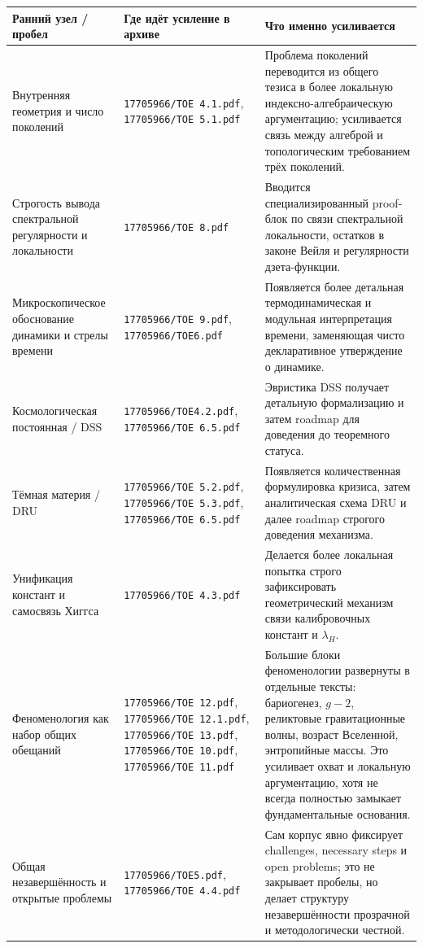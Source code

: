 \documentclass[12pt,a4paper]{article}
\begin{document}
\begin{longtable}{p{4.2cm}p{4.2cm}p{6cm}}
\toprule
Ранний узел / пробел & Где идёт усиление в архиве & Что именно усиливается \\
\midrule
\endhead
Внутренняя геометрия и число поколений & \texttt{17705966/ТОЕ 4.1.pdf}, \texttt{17705966/ТОЕ 5.1.pdf} & Проблема поколений переводится из общего тезиса в более локальную индексно-алгебраическую аргументацию; усиливается связь между алгеброй и топологическим требованием трёх поколений. \\
Строгость вывода спектральной регулярности и локальности & \texttt{17705966/ТОЕ 8.pdf} & Вводится специализированный proof-блок по связи спектральной локальности, остатков в законе Вейля и регулярности дзета-функции. \\
Микроскопическое обоснование динамики и стрелы времени & \texttt{17705966/ТОЕ 9.pdf}, \texttt{17705966/ТОЕ6.pdf} & Появляется более детальная термодинамическая и модульная интерпретация времени, заменяющая чисто декларативное утверждение о динамике. \\
Космологическая постоянная / DSS & \texttt{17705966/TOE4.2.pdf}, \texttt{17705966/ТОЕ 6.5.pdf} & Эвристика DSS получает детальную формализацию и затем roadmap для доведения до теоремного статуса. \\
Тёмная материя / DRU & \texttt{17705966/ТОЕ 5.2.pdf}, \texttt{17705966/ТОЕ 5.3.pdf}, \texttt{17705966/ТОЕ 6.5.pdf} & Появляется количественная формулировка кризиса, затем аналитическая схема DRU и далее roadmap строгого доведения механизма. \\
Унификация констант и самосвязь Хиггса & \texttt{17705966/ТОЕ 4.3.pdf} & Делается более локальная попытка строго зафиксировать геометрический механизм связи калибровочных констант и \(\lambda_H\). \\
Феноменология как набор общих обещаний & \texttt{17705966/ТОЕ 12.pdf}, \texttt{17705966/ТОЕ 12.1.pdf}, \texttt{17705966/ТОЕ 13.pdf}, \texttt{17705966/ТОЕ 10.pdf}, \texttt{17705966/ТОЕ 11.pdf} & Большие блоки феноменологии развернуты в отдельные тексты: бариогенез, \(g-2\), реликтовые гравитационные волны, возраст Вселенной, энтропийные массы. Это усиливает охват и локальную аргументацию, хотя не всегда полностью замыкает фундаментальные основания. \\
Общая незавершённость и открытые проблемы & \texttt{17705966/TOE5.pdf}, \texttt{17705966/ТОЕ 4.4.pdf} & Сам корпус явно фиксирует challenges, necessary steps и open problems; это не закрывает пробелы, но делает структуру незавершённости прозрачной и методологически честной. \\
\bottomrule
\end{longtable}
\end{document}
